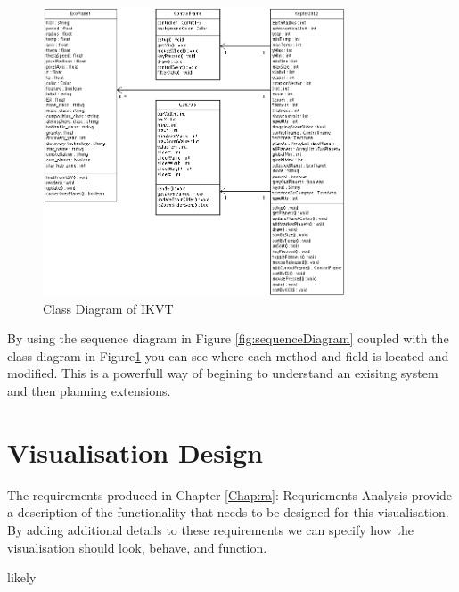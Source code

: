 \begin{enumerate}
\begin{figure}[H]
      \includegraphics[width=0.8\textwidth]{images/classDiagram.png}
  \caption{Class Diagram of IKVT}  
  \label{fig:classDiagram}
\end{figure}
\end{enumerate}

By using
the sequence diagram in Figure \ref{fig:sequenceDiagram} coupled with the class
diagram in Figure\ref{fig:classDiagram} you can see where each method and field
is located and modified. This is a powerfull way of begining to understand an
exisitng system and then planning extensions.

\section{Visualisation Design}
The requirements produced in Chapter \ref{Chap:ra}: Requriements Analysis
provide a
description of the functionality that needs to be designed for this
visualisation. By adding additional details to these requirements we can specify
how the visualisation should look, behave, and function.

likely
\clearpage
